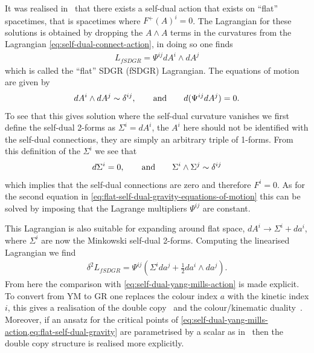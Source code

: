 \documentclass[10pt]{report}
\theoremstyle{definition}
\begin{document}
It was realised in~\cite{Flat_Self_dual_Krasno_2021} that there exists a self-dual action that exists on ``flat'' spacetimes, that is spacetimes where $F^+{(A)}^i = 0$. The Lagrangian for these solutions is obtained by dropping the $A \wedge A$ terms in the curvatures from the Lagrangian \cref{eq:self-dual-connect-action}, in doing so one finds
\begin{align}
    L_{fSDGR} = \Psi^{ij} dA^i \wedge dA^j
\end{align}
which is called the ``flat'' SDGR (fSDGR) Lagrangian. The equations of motion are given by 
\begin{align}
    dA^i \wedge dA^j \sim \delta^{ij}, \qquad {\rm and} \qquad d(\Psi^{ij} dA^j) = 0. \label{eq:flat-self-dual-gravity-equations-of-motion}
\end{align}
To see that this gives solution where the self-dual curvature vanishes we first define the self-dual 2-forms as $\Sigma^i = dA^i$, the $A^i$ here should not be identified with the self-dual connections, they are simply an arbitrary triple of 1-forms. From this definition of the $\Sigma^i$ we see that 
\begin{align}
    d\Sigma^i = 0, \qquad {\rm and} \qquad \Sigma^i \wedge \Sigma^j \sim \delta^{ij}
\end{align}
which implies that the self-dual connections are zero and therefore $F^i = 0$. As for the second equation in \cref{eq:flat-self-dual-gravity-equations-of-motion} this can be solved by imposing that the Lagrange multipliers $\Psi^{ij}$ are constant. 

This Lagrangian is also suitable for expanding around flat space, $dA^i \rightarrow \Sigma^i + da^i$, where $\Sigma^i$ are now the Minkowski self-dual 2-forms. Computing the linearised Lagrangian we find
\begin{align}
    \delta^2 L_{fSDGR} = \Psi^{ij} (\Sigma^i d a^j + \frac{1}{2} da^i \wedge da^j). \label{eq:flat-self-dual-gravity}
\end{align}
From here the comparison with \cref{eq:self-dual-yang-mills-action} is made explicit. To convert from YM to GR one replaces the colour index $a$ with the kinetic index $i$, this gives a realisation of the double copy~\cite{Perturbative_Qu_Bern_2010} and the colour/kinematic duality~\cite{The_Kinematic_A_Montei_2011}. Moreover, if an ansatz for the critical points of \cref{eq:self-dual-yang-mills-action,eq:flat-self-dual-gravity} are parametrised by a scalar as in~\cite{Pure_connection_Krasno_2024} then the double copy structure is realised more explicitly.
\end{document}
